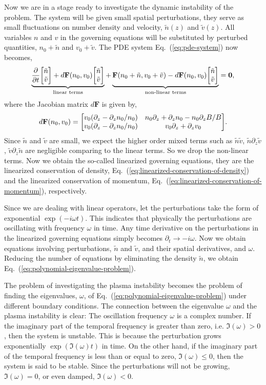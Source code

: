 Now we are in a stage ready to investigate the dynamic instability of the problem. The system will be given small spatial perturbations, they serve as small fluctuations on number density and velocity, $\tilde{n}(z)$ and $\tilde{v}(z)$. All variables $n$ and $v$ in the governing equations will be substituted by perturbed quantities, $n_0+\tilde{n}$ and $v_0+\tilde{v}$. The PDE system Eq.~(\ref{eq:pde-system}) now becomes,
\begin{equation}
	\underbrace{\pdv{t}\mqty[\tilde{n}\\ \tilde{v}] + d\mathbf{F}(n_0,v_0)\mqty[\tilde{n}\\ \tilde{v}] }_{\text{linear terms}}
	+ \underbrace{\mathbf{F}(n_0+\tilde{n}, v_0+\tilde{v}) - d\mathbf{F}(n_0,v_0)\mqty[\tilde{n}\\ \tilde{v}]}_{\text{non-linear terms}}
	= \mathbf{0},
	\label{eq:perturbed-pde-system}
\end{equation}
where the Jacobian matrix $d\mathbf{F}$ is given by,
\begin{equation}
	d\mathbf{F}(n_0, v_0) =
	\mqty[ v_0(\partial_z - \partial_zn_0/n_0) & n_0\partial_z + \partial_zn_0 - n_0\partial_zB/B \\
		v_0(\partial_z - \partial_zn_0/n_0) & v_0\partial_z + \partial_zv_0
	].
\end{equation}
Since $\tilde{n}$ and $\tilde{v}$ are small, we expect the higher order mixed terms such as $\tilde{n}\tilde{v}$, $\tilde{n}\partial_z\tilde{v}$, $\tilde{v}\partial_z\tilde{n}$ are negligible comparing to the linear terms. So we drop the non-linear terms. Now we obtain the so-called linearized governing equations, they are the linearized conservation of density, Eq.~(\ref{eq:linearized-conservation-of-density}) and the linearized conservation of momentum, Eq.~(\ref{eq:linearized-conservation-of-momentum}), respectively.

Since we are dealing with linear operators, let the perturbations take the form of exponential $\exp(-i\omega t)$. This indicates that physically the perturbations are oscillating with frequency $\omega$ in time. Any time derivative on the perturbations in the linearized governing equations simply becomes $\partial_t \to -i\omega$. Now we obtain equations involving perturbations, $\tilde{n}$ and $\tilde{v}$, and their spatial derivatives, and $\omega$. Reducing the number of equations by eliminating the density $\tilde{n}$, we obtain Eq.~(\ref{eq:polynomial-eigenvalue-problem}).

The problem of investigating the plasma instability becomes the problem of finding the eigenvalues, $\omega$, of Eq.~(\ref{eq:polynomial-eigenvalue-problem}) under different boundary conditions. The connection between the eigenvalue $\omega$ and the plasma instability is clear: The oscillation frequency $\omega$ is a complex number. If the imaginary part of the temporal frequency is greater than zero, i.e. $\Im(\omega) > 0$, then the system is unstable. This is because the perturbation grows exponentially $\exp(\Im(\omega)t)$ in time. On the other hand, if the imaginary part of the temporal frequency is less than or equal to zero, $\Im(\omega) \leq 0$, then the system is said to be stable. Since the perturbations will not be growing, $\Im(\omega)=0$, or even damped, $\Im(\omega) < 0$.

